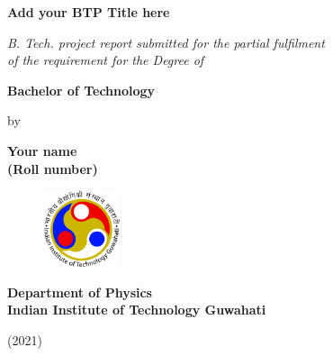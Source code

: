 
\begin{titlepage} %
\begin{center}
	\fontsize{18pt}{25pt}\selectfont %
	\textbf{Add your BTP Title here}
	
	\vspace{2cm}
	
	\fontsize{14pt}{18pt}\selectfont
    \textit{B. Tech. project report submitted for the partial fulfilment \\ of the requirement for the Degree of}
    
    \vspace{1cm}
    
    \textbf{Bachelor of Technology}
    
    \vspace{2cm}
    
    by
    
    \vspace{0.7cm}
    
    \textbf{Your name \\ (Roll number)}
    
    \vfill
    
    \begin{figure}[!h]
        \centering
        \includegraphics[width=0.2\textwidth]{Content/IITG_logo.png}
    \end{figure}
	
	\textbf{Department of Physics \\ Indian Institute of Technology Guwahati}
	
	(2021)
\end{center}
	
\end{titlepage}
